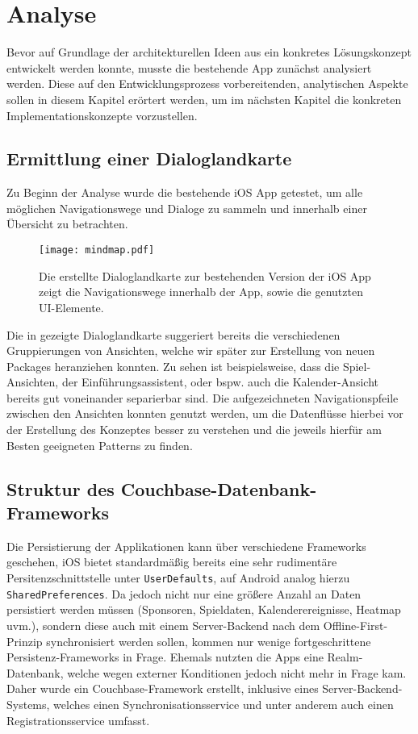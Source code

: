 \chapter{Analyse}\label{ch:analyse}

Bevor auf Grundlage der architekturellen Ideen aus  ein konkretes Lösungskonzept entwickelt werden konnte, musste die bestehende App zunächst analysiert werden. Diese auf den Entwicklungsprozess vorbereitenden, analytischen Aspekte sollen in diesem Kapitel erörtert werden, um im nächsten Kapitel die konkreten Implementationskonzepte vorzustellen.

\section{Ermittlung einer Dialoglandkarte}

Zu Beginn der Analyse wurde die bestehende iOS App getestet, um alle möglichen Navigationswege und Dialoge zu sammeln und innerhalb einer Übersicht zu betrachten.

\begin{figure}[H]
\texttt{[image: mindmap.pdf]}
\caption{Die erstellte Dialoglandkarte zur bestehenden Version der iOS App zeigt die Navigationswege innerhalb der App, sowie die genutzten UI-Elemente.}\label{fig:mindmap}
\end{figure}

\noindent Die in  gezeigte Dialoglandkarte suggeriert bereits die verschiedenen Gruppierungen von Ansichten, welche wir später zur Erstellung von neuen Packages heranziehen konnten. Zu sehen ist beispielsweise, dass die Spiel-Ansichten, der Einführungsassistent, oder bspw. auch die Kalender-Ansicht bereits gut voneinander separierbar sind. Die aufgezeichneten Navigationspfeile zwischen den Ansichten konnten genutzt werden, um die Datenflüsse hierbei vor der Erstellung des Konzeptes besser zu verstehen und die jeweils hierfür am Besten geeigneten Patterns zu finden.

\section{Struktur des Couchbase-Datenbank-Frameworks}

Die Persistierung der Applikationen kann über verschiedene Frameworks geschehen, iOS bietet standardmäßig bereits eine sehr rudimentäre Persitenzschnittstelle unter \texttt{UserDefaults}, auf Android analog hierzu \texttt{SharedPreferences}. Da jedoch nicht nur eine größere Anzahl an Daten persistiert werden müssen (Sponsoren, Spieldaten, Kalenderereignisse, Heatmap uvm.), sondern diese auch mit einem Server-Backend nach dem Offline-First-Prinzip synchronisiert werden sollen, kommen nur wenige fortgeschrittene Persistenz-Frameworks in Frage. Ehemals nutzten die Apps eine Realm-Datenbank, welche wegen externer Konditionen jedoch nicht mehr in Frage kam. Daher wurde ein Couchbase-Framework erstellt, inklusive eines Server-Backend-Systems, welches einen Synchronisationsservice und unter anderem auch einen Registrationsservice umfasst.


